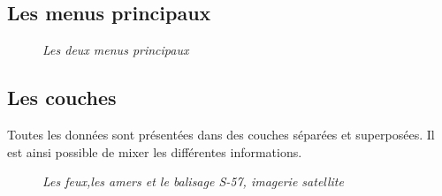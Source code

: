 \subsection{Les menus principaux}

\begin{center}
\begin{figure}[ht]
\caption{\label{equiProj}\textit{Les deux menus principaux}}
\end{figure}
\end{center}
\newpage
\subsection{Les couches}
Toutes les données sont présentées dans des couches séparées et superposées. Il est ainsi possible de mixer les différentes informations.
\begin{center}
\begin{figure}[ht]
\caption{\label{equiProj}\textit{Les feux,les amers et le balisage  S-57, imagerie satellite}}
\end{figure}
\end{center}
